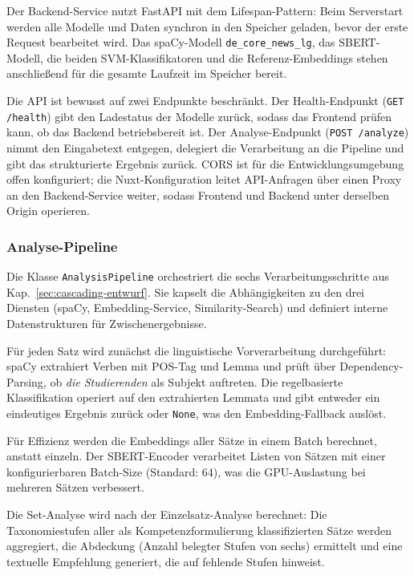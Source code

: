 Der Backend-Service nutzt FastAPI mit dem Lifespan-Pattern: Beim Serverstart werden alle Modelle und Daten synchron in den Speicher geladen, bevor der erste Request bearbeitet wird.
Das spaCy-Modell \texttt{de\_core\_news\_lg}, das SBERT-Modell, die beiden SVM-Klassifikatoren und die Referenz-Embeddings stehen anschließend für die gesamte Laufzeit im Speicher bereit.

Die API ist bewusst auf zwei Endpunkte beschränkt.
Der Health-Endpunkt (\texttt{GET /health}) gibt den Ladestatus der Modelle zurück, sodass das Frontend prüfen kann, ob das Backend betriebsbereit ist.
Der Analyse-Endpunkt (\texttt{POST /analyze}) nimmt den Eingabetext entgegen, delegiert die Verarbeitung an die Pipeline und gibt das strukturierte Ergebnis zurück.
CORS ist für die Entwicklungsumgebung offen konfiguriert; die Nuxt-Konfiguration leitet API-Anfragen über einen Proxy an den Backend-Service weiter, sodass Frontend und Backend unter derselben Origin operieren.

\subsubsection{Analyse-Pipeline}\label{sec:impl-pipeline}

Die Klasse \texttt{AnalysisPipeline} orchestriert die sechs Verarbeitungsschritte aus Kap.~\ref{sec:cascading-entwurf}.
Sie kapselt die Abhängigkeiten zu den drei Diensten (spaCy, Embedding-Service, Similarity-Search) und definiert interne Datenstrukturen für Zwischenergebnisse.

Für jeden Satz wird zunächst die linguistische Vorverarbeitung durchgeführt: spaCy extrahiert Verben mit POS-Tag und Lemma und prüft über Dependency-Parsing, ob \emph{die Studierenden} als Subjekt auftreten.
Die regelbasierte Klassifikation operiert auf den extrahierten Lemmata und gibt entweder ein eindeutiges Ergebnis zurück oder \texttt{None}, was den Embedding-Fallback auslöst.

Für Effizienz werden die Embeddings aller Sätze in einem Batch berechnet, anstatt einzeln.
Der SBERT-Encoder verarbeitet Listen von Sätzen mit einer konfigurierbaren Batch-Size (Standard: 64), was die GPU-Auslastung bei mehreren Sätzen verbessert.

Die Set-Analyse wird nach der Einzelsatz-Analyse berechnet: Die Taxonomiestufen aller als Kompetenzformulierung klassifizierten Sätze werden aggregiert, die Abdeckung (Anzahl belegter Stufen von sechs) ermittelt und eine textuelle Empfehlung generiert, die auf fehlende Stufen hinweist.


